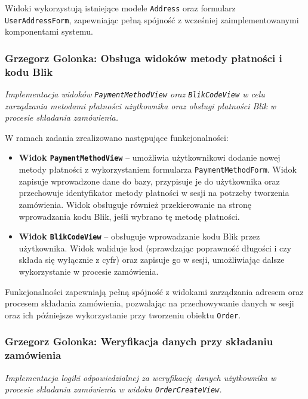 \documentclass[12pt,a4paper,oneside]{article}
\theoremstyle{definition}
\numberwithin{equation}{section}
\begin{document}
Widoki wykorzystują istniejące modele \texttt{Address} oraz formularz\\ \texttt{UserAddressForm}, zapewniając pełną spójność z wcześniej zaimplementowanymi komponentami systemu.

%
%
\subsubsection{Grzegorz Golonka: Obsługa widoków metody płatności i kodu Blik}
\label{section:1.3.25}
\textit{
Implementacja widoków \texttt{PaymentMethodView} oraz \texttt{BlikCodeView} w celu zarządzania metodami płatności użytkownika oraz obsługi płatności Blik w procesie składania zamówienia.
}

W ramach zadania zrealizowano następujące funkcjonalności:
\begin{itemize}
    \item \textbf{Widok \texttt{PaymentMethodView}} – umożliwia użytkownikowi dodanie nowej metody płatności z wykorzystaniem formularza \texttt{PaymentMethodForm}. Widok zapisuje wprowadzone dane do bazy, przypisuje je do użytkownika oraz przechowuje identyfikator metody płatności w sesji na potrzeby tworzenia zamówienia. Widok obsługuje również przekierowanie na stronę wprowadzania kodu Blik, jeśli wybrano tę metodę płatności.
    \item \textbf{Widok \texttt{BlikCodeView}} – obsługuje wprowadzanie kodu Blik przez użytkownika. Widok waliduje kod (sprawdzając poprawność długości i czy składa się wyłącznie z cyfr) oraz zapisuje go w sesji, umożliwiając dalsze wykorzystanie w procesie zamówienia.
\end{itemize}

Funkcjonalności zapewniają pełną spójność z widokami zarządzania adresem oraz procesem składania zamówienia, pozwalając na przechowywanie danych w sesji oraz ich późniejsze wykorzystanie przy tworzeniu obiektu \texttt{Order}.

%
%
\subsubsection{Grzegorz Golonka: Weryfikacja danych przy składaniu zamówienia}
\label{section:1.3.26}
\textit{
Implementacja logiki odpowiedzialnej za weryfikację danych użytkownika w procesie składania zamówienia w widoku \texttt{OrderCreateView}.
}
\end{document}
